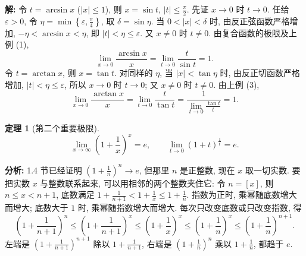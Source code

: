 \documentclass[UTF8,openany]{ctexbook}
\theoremstyle{chinesetextbook}
\newtheorem{theorem}{定理}[section]
\newenvironment{cnsolution}{\par\indent\textbf{解:} \ignorespaces}{\par}
\begin{document}
\begin{cnsolution}
令 $t=\arcsin x$ ($|x|\le1$), 则 $x=\sin t$, $\displaystyle|t|\le\frac\pi2$. 先证 $x\to0$ 时 $t\to0$. 任给 $\varepsilon>0$, 令 $\displaystyle\eta=\min\left\{\varepsilon,\frac\pi4\right\}$, 取 $\delta=\sin\eta$. 当 $0<|x|<\delta$ 时, 由反正弦函数严格增加, $-\eta<\arcsin x<\eta$, 即 $|t|<\eta\le\varepsilon$. 又 $x\ne0$ 时 $t\ne0$. 由复合函数的极限及上例 (1),
\[
\lim_{x\to0}\frac{\arcsin x}x=\lim_{t\to0}\frac t{\sin t}=1.
\]
令 $t=\arctan x$, 则 $x=\tan t$. 对同样的 $\eta$, 当 $|x|<\tan\eta$ 时, 由反正切函数严格增加, $|t|<\eta\le\varepsilon$, 所以 $x\to0$ 时 $t\to0$; 又 $x\ne0$ 时 $t\ne0$. 由上例 (3),
\[
\lim_{x\to0}\frac{\arctan x}x=\lim_{t\to0}\frac t{\tan t}=\frac1{\displaystyle\lim_{t\to0}\frac{\tan t}t}=1.
\]
\end{cnsolution}
\begin{theorem}[第二个重要极限]
\[
\lim_{x\to\infty}\left(1+\frac1x\right)^x=e,\qquad\lim_{t\to0}(1+t)^{\frac1t}=e.
\]
\end{theorem}
\par\indent\textbf{分析:} 1.4 节已经证明 $\displaystyle\left(1+\frac1n\right)^n\to e$, 但那里 $n$ 是正整数, 现在 $x$ 取一切实数. 要把实数 $x$ 与整数联系起来, 可以用相邻的两个整数夹住它: 令 $n=[x]$, 则 $n\le x<n+1$, 底数满足 $\displaystyle1+\frac1{n+1}<1+\frac1x\le1+\frac1n$. 指数为正时, 乘幂随底数增大而增大; 底数大于 $1$ 时, 乘幂随指数增大而增大. 每次只改变底数或只改变指数, 得
\[
\left(1+\frac1{n+1}\right)^n\le\left(1+\frac1{n+1}\right)^x\le\left(1+\frac1x\right)^x\le\left(1+\frac1n\right)^x\le\left(1+\frac1n\right)^{n+1}.
\]
左端是 $\displaystyle\left(1+\frac1{n+1}\right)^{n+1}$ 除以 $\displaystyle1+\frac1{n+1}$, 右端是 $\displaystyle\left(1+\frac1n\right)^n$ 乘以 $\displaystyle1+\frac1n$, 都趋于 $e$.
\end{document}
